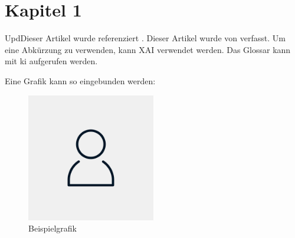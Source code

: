 \section{Kapitel 1}

UpdDieser Artikel wurde referenziert \cite[vgl.][Seite 132]{lowry_protein_1951}. Dieser Artikel wurde von \citeauthor{lowry_protein_1951} verfasst. Um eine Abkürzung zu verwenden, kann \ac{XAI} verwendet werden. Das Glossar kann mit \gls{ki} aufgerufen werden.

Eine Grafik kann so eingebunden werden:
\begin{figure}[H]
    \centering
    \includegraphics[width=0.5\textwidth]{assets/placehoder.png}
    \caption{Beispielgrafik}
    \label{fig:example}
\end{figure}

\lipsum[1-2]